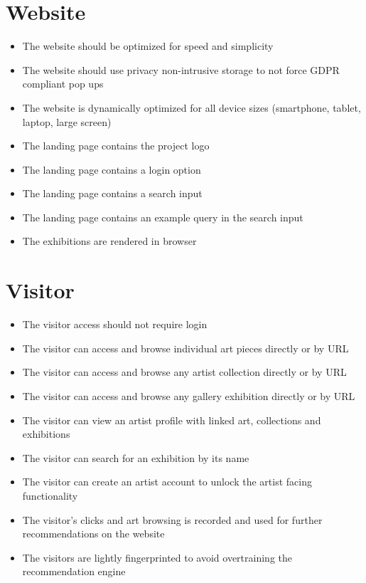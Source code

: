 \section{Website}
    \begin{itemize}
        \item The website should be optimized for speed and simplicity
        \item The website should use privacy non-intrusive storage to not force GDPR compliant pop ups
        \item The website is dynamically optimized for all device sizes (smartphone, tablet, laptop, large screen)
        \item The landing page contains the project logo
        \item The landing page contains a login option
        \item The landing page contains a search input
        \item The landing page contains an example query in the search input
        \item The exhibitions are rendered in browser
    \end{itemize}

\section{Visitor}
    \begin{itemize}
        \item The visitor access should not require login
        \item The visitor can access and browse individual art pieces directly or by URL
        \item The visitor can access and browse any artist collection directly or by URL
        \item The visitor can access and browse any gallery exhibition directly or by URL
        \item The visitor can view an artist profile with linked art, collections and exhibitions
        \item The visitor can search for an exhibition by its name
        \item The visitor can create an artist account to unlock the artist facing functionality
        \item The visitor's clicks and art browsing is recorded and used for further recommendations on the website
        \item The visitors are lightly fingerprinted to avoid overtraining the recommendation engine
    \end{itemize}

